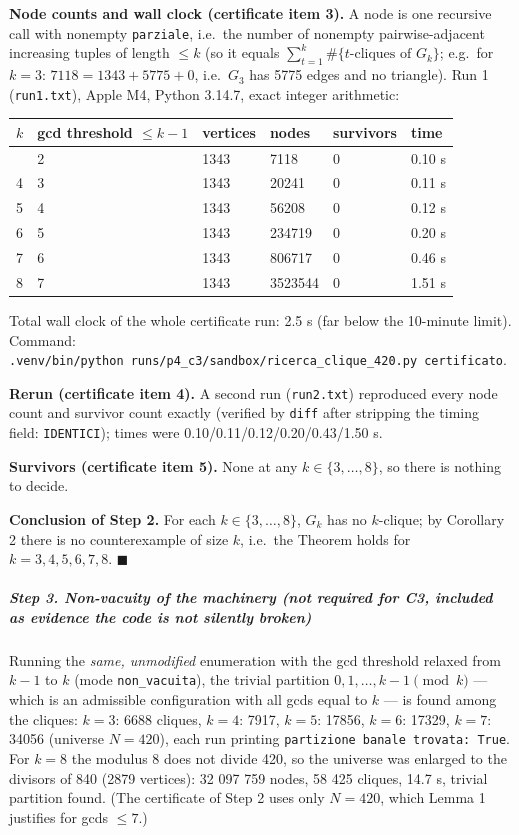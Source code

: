 \documentclass[11pt,a4paper]{article}
\begin{document}
\textbf{Node counts and wall clock (certificate item 3).} A node is one
recursive call with nonempty \texttt{parziale}, i.e.~the number of
nonempty pairwise-adjacent increasing tuples of length \(\le k\) (so it
equals \(\sum_{t=1}^{k}\#\{t\text{-cliques of }G_k\}\); e.g.~for
\(k=3\): \(7118 = 1343 + 5775 + 0\), i.e.~\(G_3\) has 5775 edges and no
triangle). Run 1 (\texttt{run1.txt}), Apple M4, Python 3.14.7, exact
integer arithmetic:

{\def\LTcaptype{none} %
\begin{longtable}[]{@{}llllll@{}}
\toprule\noalign{}
\(k\) & gcd threshold \(\le k-1\) & vertices & nodes & survivors &
time \\
\midrule\noalign{}
\endhead
\bottomrule\noalign{}
\endlastfoot
3 & 2 & 1343 & 7118 & 0 & 0.10 s \\
4 & 3 & 1343 & 20241 & 0 & 0.11 s \\
5 & 4 & 1343 & 56208 & 0 & 0.12 s \\
6 & 5 & 1343 & 234719 & 0 & 0.20 s \\
7 & 6 & 1343 & 806717 & 0 & 0.46 s \\
8 & 7 & 1343 & 3523544 & 0 & 1.51 s \\
\end{longtable}
}

Total wall clock of the whole certificate run: 2.5 s (far below the
10-minute limit). Command:
\texttt{.venv/bin/python\ runs/p4\_c3/sandbox/ricerca\_clique\_420.py\ certificato}.

\textbf{Rerun (certificate item 4).} A second run (\texttt{run2.txt})
reproduced every node count and survivor count exactly (verified by
\texttt{diff} after stripping the timing field: \texttt{IDENTICI});
times were 0.10/0.11/0.12/0.20/0.43/1.50 s.

\textbf{Survivors (certificate item 5).} None at any
\(k\in\{3,\dots,8\}\), so there is nothing to decide.

\textbf{Conclusion of Step 2.} For each \(k\in\{3,\dots,8\}\), \(G_k\)
has no \(k\)-clique; by Corollary 2 there is no counterexample of size
\(k\), i.e.~the Theorem holds for \(k=3,4,5,6,7,8\). \(\blacksquare\)

\subparagraph{Step 3. Non-vacuity of the machinery (not required for C3,
included as evidence the code is not silently
broken)}\label{step-3.-non-vacuity-of-the-machinery-not-required-for-c3-included-as-evidence-the-code-is-not-silently-broken}

Running the \emph{same, unmodified} enumeration with the gcd threshold
relaxed from \(k-1\) to \(k\) (mode \texttt{non\_vacuita}), the trivial
partition \(0,1,\dots,k-1 \pmod k\) --- which is an admissible
configuration with all gcds equal to \(k\) --- is found among the
cliques: \(k=3\): 6688 cliques, \(k=4\): 7917, \(k=5\): 17856, \(k=6\):
17329, \(k=7\): 34056 (universe \(N=420\)), each run printing
\texttt{partizione\ banale\ trovata:\ True}. For \(k=8\) the modulus 8
does not divide 420, so the universe was enlarged to the divisors of 840
(2879 vertices): 32 097 759 nodes, 58 425 cliques, 14.7 s, trivial
partition found. (The certificate of Step 2 uses only \(N=420\), which
Lemma 1 justifies for gcds \(\le7\).)
\end{document}
